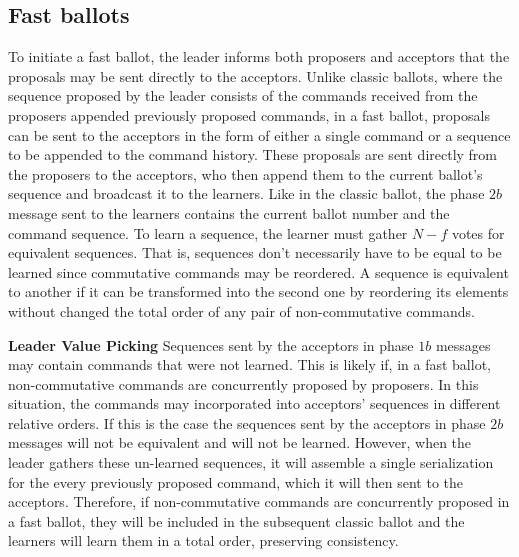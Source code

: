 \subsection{Fast ballots} 

To initiate a fast ballot, the leader informs both proposers and acceptors that the proposals may be sent directly to the acceptors. Unlike classic ballots, where the sequence proposed by the leader consists of the commands received from the proposers appended previously proposed commands, in a fast ballot, proposals can be sent to the acceptors in the form of either a single command or a sequence to be appended to the command history. These proposals are sent directly from the proposers to the acceptors, who then append them to the current ballot's sequence and broadcast it to the learners. Like in the classic ballot, the phase $2b$ message sent to the learners contains the current ballot number and the command sequence. To learn a sequence, the learner must gather $N-f$ votes for equivalent sequences. That is, sequences don't necessarily have to be equal to be learned since commutative commands may be reordered. A sequence is equivalent to another if it can be transformed into the second one by reordering its elements without changed the total order of any pair of non-commutative commands.


\textbf{Leader Value Picking} Sequences sent by the acceptors in phase $1b$ messages may contain commands that were not learned. This is likely if, in a fast ballot, non-commutative commands are  concurrently proposed by proposers. In this situation, the commands may incorporated into acceptors' sequences in different relative orders. If this is the case the sequences sent by the acceptors in phase $2b$ messages will not be equivalent and will not be learned. However, when the leader gathers these un-learned sequences, it will assemble a single serialization for the every previously proposed command, which it will then sent to the acceptors. Therefore, if non-commutative commands are concurrently proposed in a fast ballot, they will be included in the subsequent classic ballot and the learners will learn them in a total order, preserving consistency.
